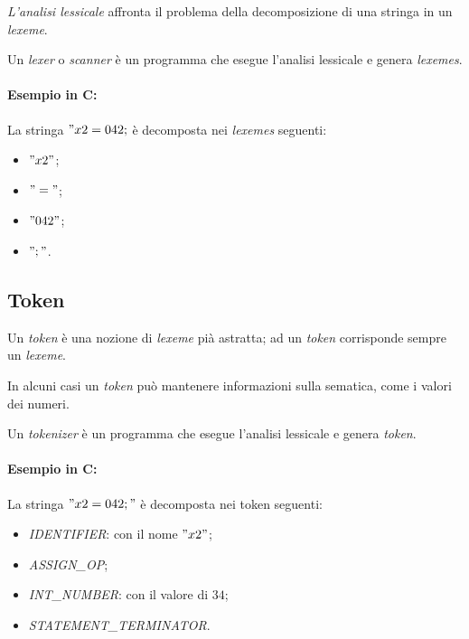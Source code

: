 \begin{theorem}
  \emph{L'analisi lessicale} affronta il problema della decomposizione di
  una stringa in un \emph{lexeme}.
\end{theorem}

\begin{theorem}
  Un \emph{lexer} o \emph{scanner} è un programma che esegue l'analisi
  lessicale e genera \emph{lexemes}.
\end{theorem}

\paragraph{Esempio in C:}
La stringa $"x2=042;$ è decomposta nei \emph{lexemes} seguenti:
\begin{itemize}
  \item $"x2"$;
  \item $"="$;
  \item $"042"$;
  \item $";"$.
\end{itemize}

\subsection{Token}
Un \emph{token} è una nozione di \emph{lexeme} pià astratta; ad un \emph{token}
corrisponde sempre un \emph{lexeme}.

In alcuni casi un \emph{token} può mantenere informazioni sulla sematica,
come i valori dei numeri.

Un \emph{tokenizer} è un programma che esegue l'analisi lessicale e genera
\emph{token}.

\paragraph{Esempio in C:}
La stringa $"x2=042;"$ è decomposta nei token seguenti:
\begin{itemize}
  \item \emph{IDENTIFIER}: con il nome $"x2"$;
  \item \emph{ASSIGN\_OP};
  \item \emph{INT\_NUMBER}: con il valore di $34$;
  \item \emph{STATEMENT\_TERMINATOR}.
\end{itemize}
